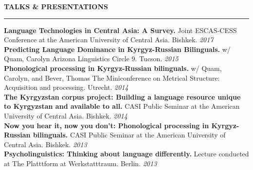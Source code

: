 \documentclass{resume} %
\begin{document}






\begin{minipage}{\textwidth}

\sectionskip
\MakeUppercase{\textbf{Talks \& Presentations}}
  \sectionlineskip
  \hrule
\vspace{.5cm}

{\bf Language Technologies in Central Asia: A Survey.} {Joint ESCAS-CESS Conference at the American University of Central Asia. Bishkek.} \hfill {\em 2017} \\

{\bf Predicting Language Dominance in Kyrgyz-Russian Bilinguals.} {w/ Quam, Carolyn} {Arizona Linguistics Circle 9. Tucson.} \hfill {\em 2015} \\

{\bf Phonological processing in Kyrgyz-Russian bilinguals.} {w/ Quam, Carolyn, and Bever, Thomas} {The Miniconference on Metrical Structure: Acquisition and processing. Utrecht.} \hfill {\em 2014} \\

{\bf The Kyrgyzstan corpus project: Building a language resource unique to Kyrgyzstan and available to all.} {CASI Public Seminar at the American University of Central Asia. Bishkek.} \hfill {\em 2014} \\

{\bf Now you hear it, now you don’t: Phonological processing in Kyrgyz-Russian bilinguals.} {CASI Public Seminar at the American University of Central Asia. Bishkek.} \hfill {\em 2013} \\

{\bf Psycholinguistics: Thinking about language differently.} {Lecture conducted at The Platttform at Werkstatttraum. Berlin.} \hfill {\em 2013} \\


\end{minipage}
\end{document}
